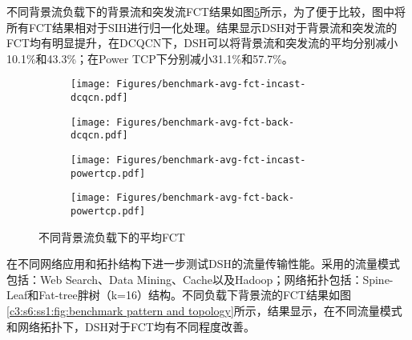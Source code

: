 不同背景流负载下的背景流和突发流FCT结果如图\ref{c3:s6:ss1:fig:benchmark fct}所示，为了便于比较，图中将所有FCT结果相对于SIH进行归一化处理。结果显示DSH对于背景流和突发流的FCT均有明显提升，在DCQCN下，DSH可以将背景流和突发流的平均分别减小10.1\%和43.3\%；在Power TCP下分别减小31.1\%和57.7\%。

\begin{figure}[H]
  \begin{subfigure}[b]{0.49\linewidth}
      \centering
      \texttt{[image: Figures/benchmark-avg-fct-incast-dcqcn.pdf]}
      \label{c3:s6:ss1:fig:sub1:benchmark fct burst dcqcn}
  \end{subfigure}
  \begin{subfigure}[b]{0.49\linewidth}
      \centering
      \texttt{[image: Figures/benchmark-avg-fct-back-dcqcn.pdf]}
      \label{c3:s6:ss1:fig:sub2:benchmark fct back dcqcn}
  \end{subfigure}
  \begin{subfigure}[b]{0.49\linewidth}
    \centering
    \texttt{[image: Figures/benchmark-avg-fct-incast-powertcp.pdf]}
    \label{c3:s6:ss1:fig:sub1:benchmark fct burst powertcp}
  \end{subfigure}
  \begin{subfigure}[b]{0.49\linewidth}
    \centering
    \texttt{[image: Figures/benchmark-avg-fct-back-powertcp.pdf]}
    \label{c3:s6:ss1:fig:sub1:throughput of f0 powertcp}
  \end{subfigure} 
  \caption{不同背景流负载下的平均FCT}
  \label{c3:s6:ss1:fig:benchmark fct}
\end{figure}

在不同网络应用和拓扑结构下进一步测试DSH的流量传输性能。采用的流量模式包括：Web Search\cite{SIGCOMM10DCTCP}、Data Mining\cite{SIGCOMM09VL2}、Cache\cite{SIGCOMM15FB}以及Hadoop\cite{SIGCOMM15FB}；网络拓扑包括：Spine-Leaf和Fat-tree胖树\cite{al2008scalable}（k=16）结构。不同负载下背景流的FCT结果如图\ref{c3:s6:ss1:fig:benchmark pattern and topology}所示，结果显示，在不同流量模式和网络拓扑下，DSH对于FCT均有不同程度改善。


